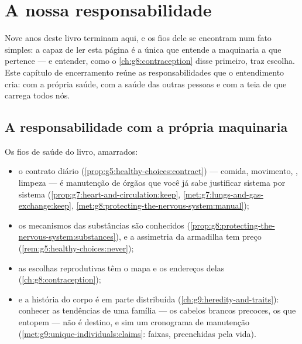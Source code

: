 \chapter{A nossa responsabilidade}\label{ch:g9:our-responsibility}

Nove anos deste livro terminam aqui, e os fios dele se
encontram num fato simples: a  capaz de ler esta
página é a única  que entende a maquinaria a que
pertence --- e entender, como o \cref{ch:g8:contraception}
disse primeiro, traz escolha. Este capítulo de encerramento
reúne as responsabilidades que o entendimento cria: com a
própria saúde, com a saúde das outras pessoas e com a teia de
 que carrega todos nós.

\section{A responsabilidade com a própria maquinaria}

\begin{proposition}\label{prop:g9:our-responsibility:self}
Os fios de saúde do livro, amarrados:
\begin{itemize}
  \item o contrato diário
        (\cref{prop:g5:healthy-choices:contract}) --- comida,
        movimento, , limpeza --- é manutenção de órgãos
        que você já sabe justificar sistema por sistema
        (\cref{prop:g7:heart-and-circulation:keep},
        \cref{met:g7:lungs-and-gas-exchange:keep},
        \cref{met:g8:protecting-the-nervous-system:manual});
  \item os mecanismos das substâncias são conhecidos
        (\cref{prop:g8:protecting-the-nervous-system:substances}),
        e a assimetria da armadilha tem preço
        (\cref{rem:g5:healthy-choices:never});
  \item as escolhas reprodutivas têm o mapa e os endereços
        delas (\cref{ch:g8:contraception});
  \item e a história do corpo é em parte distribuída
        (\cref{ch:g9:heredity-and-traits}): conhecer as
        tendências de uma família --- os cabelos brancos
        precoces, os  que entopem --- não é destino,
        e sim um cronograma de manutenção
        (\cref{met:g9:unique-individuals:claims}: faixas,
        preenchidas pela vida).
\end{itemize}
\end{proposition}
\admitted

